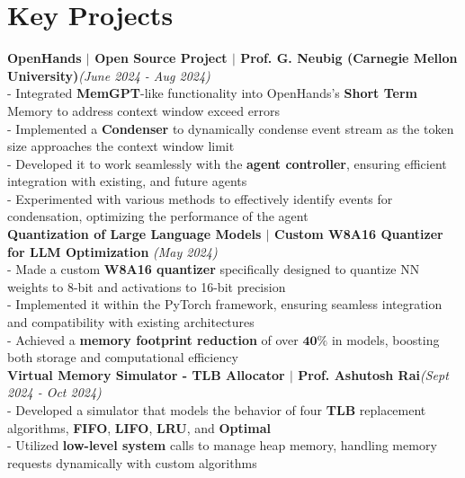 \documentclass[a4paper,10pt]{article}
\begin{document}
\section{\textbf{Key Projects}}
\textbf{OpenHands $\mid$ Open Source Project $\mid$ Prof. G. Neubig (Carnegie Mellon University)}\hfill\textit{(June 2024 - Aug 2024)} \href{https://github.com/khushvind/OpenDevin}{\raisebox{-0.05\height}\faGithub}\\
- Integrated \textbf{MemGPT}-like functionality into OpenHands's \textbf{Short Term} Memory to address context window exceed errors\\
- Implemented a \textbf{Condenser} to dynamically condense event stream as the token size approaches the context window limit\\
- Developed it to work seamlessly with the \textbf{agent controller}, ensuring efficient integration with existing, and future agents\\
- Experimented with various methods to effectively identify events for condensation, optimizing the performance of the agent\\
\textbf{Quantization of Large Language Models $\mid$ Custom W8A16 Quantizer for LLM Optimization} \hfill\textit{(May 2024)} \href{https://github.com/khushvind/Quantization-LLMs}{\raisebox{-0.05\height}\faGithub}\\
- Made a custom \textbf{W8A16 quantizer} specifically designed to quantize NN weights to 8-bit and activations to 16-bit precision\\
- Implemented it within the PyTorch framework, ensuring seamless integration and compatibility with existing architectures\\
- Achieved a \textbf{memory footprint reduction} of over $\textbf{40\%}$ in models, boosting both storage and computational efficiency\\
\textbf{Virtual Memory Simulator - TLB Allocator $\mid$ Prof. Ashutosh Rai}\hfill\textit{(Sept 2024 - Oct 2024)} \href{https://github.com/khushvind/Virtual_Memory_Simulator-TLB_Allocator}{\raisebox{-0.05\height}\faGithub}\\
- Developed a simulator that models the behavior of four \textbf{TLB} replacement algorithms, \textbf{FIFO}, \textbf{LIFO}, \textbf{LRU}, and \textbf{Optimal}\\
- Utilized \textbf{low-level system} calls to manage heap memory, handling memory requests dynamically with custom algorithms\\
\end{document}
